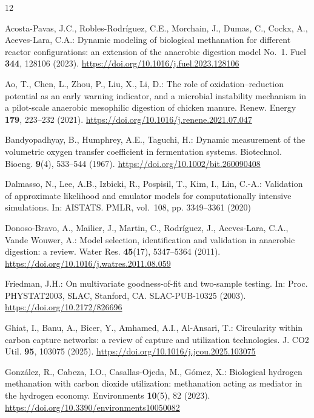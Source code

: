 \documentclass[runningheads]{llncs}
\begin{document}
\begin{thebibliography}{12}

Acosta-Pavas, J.C., Robles-Rodr\'{i}guez, C.E., Morchain, J., Dumas, C.,
Cockx, A., Aceves-Lara, C.A.: Dynamic modeling of biological methanation
for different reactor configurations: an extension of the anaerobic
digestion model No.~1. Fuel \textbf{344}, 128106 (2023).
\url{https://doi.org/10.1016/j.fuel.2023.128106}

Ao, T., Chen, L., Zhou, P., Liu, X., Li, D.: The role of
oxidation--reduction potential as an early warning indicator, and a
microbial instability mechanism in a pilot-scale anaerobic mesophilic
digestion of chicken manure. Renew. Energy \textbf{179}, 223--232 (2021).
\url{https://doi.org/10.1016/j.renene.2021.07.047}

Bandyopadhyay, B., Humphrey, A.E., Taguchi, H.: Dynamic measurement of
the volumetric oxygen transfer coefficient in fermentation systems.
Biotechnol. Bioeng. \textbf{9}(4), 533--544 (1967).
\url{https://doi.org/10.1002/bit.260090408}

Dalmasso, N., Lee, A.B., Izbicki, R., Pospisil, T., Kim, I., Lin,
C.-A.: Validation of approximate likelihood and emulator models for
computationally intensive simulations. In: AISTATS. PMLR, vol.~108,
pp. 3349--3361 (2020)

Donoso-Bravo, A., Mailier, J., Martin, C., Rodr\'{i}guez, J.,
Aceves-Lara, C.A., Vande Wouwer, A.: Model selection, identification
and validation in anaerobic digestion: a review. Water Res.
\textbf{45}(17), 5347--5364 (2011).
\url{https://doi.org/10.1016/j.watres.2011.08.059}

Friedman, J.H.: On multivariate goodness-of-fit and two-sample testing.
In: Proc. PHYSTAT2003, SLAC, Stanford, CA. SLAC-PUB-10325 (2003).
\url{https://doi.org/10.2172/826696}

Ghiat, I., Banu, A., Bicer, Y., Amhamed, A.I., Al-Ansari, T.:
Circularity within carbon capture networks: a review of capture and
utilization technologies. J. CO2 Util. \textbf{95}, 103075 (2025).
\url{https://doi.org/10.1016/j.jcou.2025.103075}

Gonz\'{a}lez, R., Cabeza, I.O., Casallas-Ojeda, M., G\'{o}mez, X.:
Biological hydrogen methanation with carbon dioxide utilization:
methanation acting as mediator in the hydrogen economy. Environments
\textbf{10}(5), 82 (2023).
\url{https://doi.org/10.3390/environments10050082}


\end{thebibliography}
\end{document}

